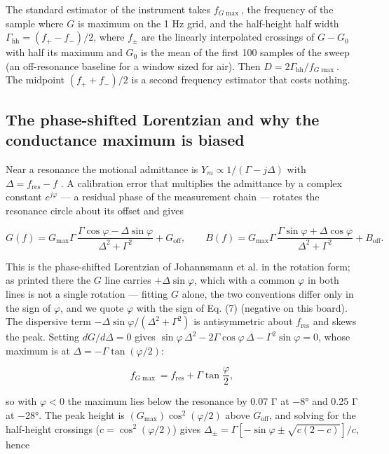 \documentclass[11pt,a4paper]{article}
\begin{document}
The standard estimator of the instrument takes \(f_{G\max}\), the
frequency of the sample where \(G\) is maximum on the 1 Hz grid, and the
half-height half width \(\Gamma_\mathrm{hh} = (f_+ - f_-)/2\), where
\(f_\pm\) are the linearly interpolated crossings of \(G - G_0\) with
half its maximum and \(G_0\) is the mean of the first 100 samples of the
sweep (an off-resonance baseline for a window sized for air). Then
\(D = 2\Gamma_\mathrm{hh}/f_{G\max}\). The midpoint \((f_+ + f_-)/2\) is
a second frequency estimator that costs nothing.

\hypertarget{the-phase-shifted-lorentzian-and-why-the-conductance-maximum-is-biased}{%
\subsection{The phase-shifted Lorentzian and why the conductance
maximum is
biased}\label{the-phase-shifted-lorentzian-and-why-the-conductance-maximum-is-biased}}

Near a resonance the motional admittance is
\(Y_m \propto 1/(\Gamma - j\Delta)\) with
\(\Delta = f_\mathrm{res} - f\) \citep[Eqs. 9--10]{Johannsmann2021}. A
calibration error that multiplies the admittance by a complex constant
\(e^{j\varphi}\) --- a residual phase of the measurement chain ---
rotates the resonance circle about its offset and gives

\[G(f) = G_\mathrm{max}\Gamma\,\frac{\Gamma\cos\varphi - \Delta\sin\varphi}{\Delta^2 + \Gamma^2} + G_\mathrm{off},\qquad B(f) = G_\mathrm{max}\Gamma\,\frac{\Gamma\sin\varphi + \Delta\cos\varphi}{\Delta^2+\Gamma^2} + B_\mathrm{off}. \tag{7}\]

This is the phase-shifted Lorentzian of Johannsmann et al. \citep[Eq.
13]{Johannsmann2021} in the rotation form; as printed there the \(G\)
line carries \(+\Delta\sin\varphi\), which with a common \(\varphi\) in
both lines is not a single rotation --- fitting \(G\) alone, the two
conventions differ only in the sign of \(\varphi\), and we quote
\(\varphi\) with the sign of Eq. (7) (negative on this board). The
dispersive term \(-\Delta\sin\varphi/(\Delta^2 + \Gamma^2)\) is
antisymmetric about \(f_\mathrm{res}\) and skews the peak. Setting
\(dG/d\Delta = 0\) gives
\(\sin\varphi\,\Delta^2 - 2\Gamma\cos\varphi\,\Delta - \Gamma^2\sin\varphi = 0\),
whose maximum is at \(\Delta = -\Gamma\tan(\varphi/2)\):

\[f_{G\max} = f_\mathrm{res} + \Gamma\tan\frac{\varphi}{2}, \tag{8}\]

so with \(\varphi < 0\) the maximum lies below the resonance by 0.07 Γ
at −8° and 0.25 Γ at −28°. The peak height is
\((G_\mathrm{max})\cos^2(\varphi/2)\) above \(G_\mathrm{off}\), and
solving for the half-height crossings (\(c = \cos^2(\varphi/2)\)) gives
\(\Delta_\pm = \Gamma[-\sin\varphi \pm \sqrt{c(2-c)}]/c\), hence
\end{document}
